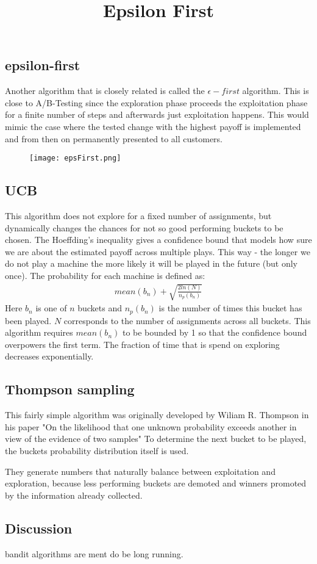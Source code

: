 \documentclass[main.tex]{subfiles}
\begin{document}
\subsection{epsilon-first}
Another algorithm that is closely related is called the $\epsilon-first$ algorithm. This is close to A/B-Testing since the exploration phase proceeds the exploitation phase for a finite number of steps and afterwards just exploitation happens. This would mimic the case where the tested change with the highest payoff is implemented and from then on permanently presented to all customers.
\begin{figure}[ht]
\texttt{[image: epsFirst.png]}
\centering
\title{Epsilon First}
\end{figure}

\subsection{UCB}
This algorithm does not explore for a fixed number of assignments, but dynamically changes the chances for not so good performing buckets to be chosen. The Hoeffding's inequality gives a confidence bound that models how sure we are about the estimated payoff across multiple plays. This way - the longer we do not play a machine the more likely it will be played in the future (but only once). The probability for each machine is defined as:
\begin{align*}
mean(b_n) + \sqrt{\frac{2ln(N)}{n_p(b_n)}}
\end{align*}
Here $b_n$ is one of $n$ buckets and $n_p(b_n)$ is the number of times this bucket has been played. $N$ corresponds to the number of assignments across all buckets. This algorithm requires $mean(b_n)$ to be bounded by 1 so that the confidence bound overpowers the first term. The fraction of time that is spend on exploring decreases exponentially.

\subsection{Thompson sampling}
This fairly simple algorithm was originally developed by Wiliam R. Thompson in his paper "On the likelihood that one unknown probability exceeds another in view of the evidence of two samples" \cite{thompson1933likelihood}
To determine the next bucket to be played, the buckets probability distribution itself is used.

They generate numbers that naturally balance between exploitation and exploration, because less performing buckets are demoted and winners promoted by the information already collected.

\subsection{Discussion}
bandit algorithms are ment do be long running.
\end{document}
